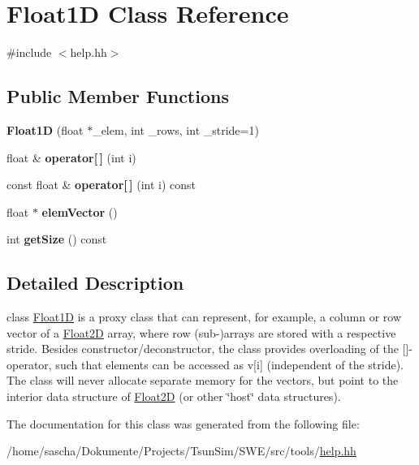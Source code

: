 \hypertarget{classFloat1D}{\section{Float1\-D Class Reference}
\label{classFloat1D}
}


{\ttfamily \#include $<$help.\-hh$>$}

\subsection*{Public Member Functions}
\begin{DoxyCompactItemize}
\item 
\hypertarget{classFloat1D_abac72fb922ec7c6d05818be856ede9a2}{{\bfseries Float1\-D} (float $\ast$\-\_\-elem, int \-\_\-rows, int \-\_\-stride=1)}\label{classFloat1D_abac72fb922ec7c6d05818be856ede9a2}

\item 
\hypertarget{classFloat1D_a4602b1598eaf2e130a55df93b9723e91}{float \& {\bfseries operator\mbox{[}$\,$\mbox{]}} (int i)}\label{classFloat1D_a4602b1598eaf2e130a55df93b9723e91}

\item 
\hypertarget{classFloat1D_af3356b364d5ff56f3740729724da0467}{const float \& {\bfseries operator\mbox{[}$\,$\mbox{]}} (int i) const }\label{classFloat1D_af3356b364d5ff56f3740729724da0467}

\item 
\hypertarget{classFloat1D_a2e7889e514588f539a8dc47c75e70601}{float $\ast$ {\bfseries elem\-Vector} ()}\label{classFloat1D_a2e7889e514588f539a8dc47c75e70601}

\item 
\hypertarget{classFloat1D_a247a2e783f7300467c55fa2e7b19aa43}{int {\bfseries get\-Size} () const }\label{classFloat1D_a247a2e783f7300467c55fa2e7b19aa43}

\end{DoxyCompactItemize}


\subsection{Detailed Description}
class \hyperlink{classFloat1D}{Float1\-D} is a proxy class that can represent, for example, a column or row vector of a \hyperlink{classFloat2D}{Float2\-D} array, where row (sub-\/)arrays are stored with a respective stride. Besides constructor/deconstructor, the class provides overloading of the \mbox{[}\mbox{]}-\/operator, such that elements can be accessed as v\mbox{[}i\mbox{]} (independent of the stride). The class will never allocate separate memory for the vectors, but point to the interior data structure of \hyperlink{classFloat2D}{Float2\-D} (or other \char`\"{}host\char`\"{} data structures). 

The documentation for this class was generated from the following file\-:\begin{DoxyCompactItemize}
\item 
/home/sascha/\-Dokumente/\-Projects/\-Tsun\-Sim/\-S\-W\-E/src/tools/\hyperlink{help_8hh}{help.\-hh}\end{DoxyCompactItemize}
